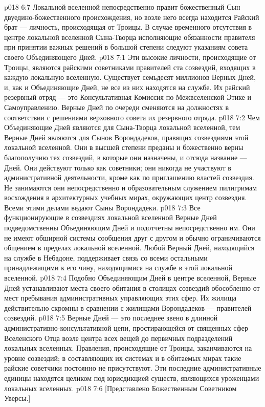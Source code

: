 \vs p018 6:7 Локальной вселенной непосредственно правит божественный Сын двуедино\hyp{}божественного происхождения, но возле него всегда находится Райский брат --- личность, происходящая от Троицы. В случае временного отсутствия в центре локальной вселенной Сына\hyp{}Творца исполняющие обязанности правителя при принятии важных решений в большой степени следуют указаниям совета своего Объединяющего Дней.
\vs p018 7:1 Эти высокие личности, происходящие от Троицы, являются райскими советниками правителей ста созвездий, входящих в каждую локальную вселенную. Существует семьдесят миллионов Верных Дней, и, как и Объединяющие Дней, не все из них находятся на службе. Их райский резервный отряд --- это Консультативная Комиссия по Межвселенской Этике и Самоуправлению. Верные Дней по очереди сменяются на должностях в соответствии с решениями верховного совета их резервного отряда.
\vs p018 7:2 Чем Объединяющие Дней являются для Сына\hyp{}Творца локальной вселенной, тем Верные Дней являются для Сынов Ворондадеков, правящих созвездиями этой локальной вселенной. Они в высшей степени преданы и божественно верны благополучию тех созвездий, в которые они назначены, и отсюда название ---  Дней. Они действуют только как советники; они никогда не участвуют в административной деятельности, кроме как по приглашению властей созвездия. Не занимаются они непосредственно и образовательным служением пилигримам восхождения в архитектурных учебных мирах, окружающих центр созвездия. Всеми этими делами ведают Сыны Ворондадеки.
\vs p018 7:3 Все функционирующие в созвездиях локальной вселенной Верные Дней подведомственны Объединяющим Дней и подотчетны непосредственно им. Они не имеют обширной системы сообщения друг с другом и обычно ограничиваются общением в пределах локальной вселенной. Любой Верный Дней, находящийся на службе в Небадоне, поддерживает связь со всеми остальными принадлежащими к его чину, находящимися на службе в этой локальной вселенной.
\vs p018 7:4 Подобно Объединяющим Дней в центре вселенной, Верные Дней устанавливают места своего обитания в столицах созвездий обособленно от мест пребывания административных управляющих этих сфер. Их жилища действительно скромны в сравнении с жилищами Ворондадеков --- правителей созвездий.
\vs p018 7:5 Верные Дней --- это последнее звено в длинной административно\hyp{}консультативной цепи, простирающейся от священных сфер Вселенского Отца возле центра всех вещей до первичных подразделений локальных вселенных. Правления, происходящие от Троицы, заканчиваются на уровне созвездий; в составляющих их системах и в обитаемых мирах такие райские советчики постоянно не присутствуют. Эти последние административные единицы находятся целиком под юрисдикцией существ, являющихся уроженцами локальных вселенных.
\vs p018 7:6 [Представлено Божественным Советником Уверсы.]
